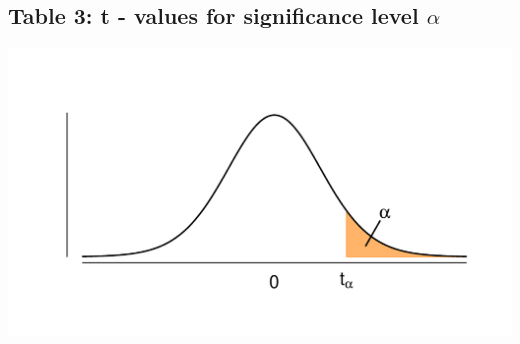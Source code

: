 \subsection{Table 3: t - values for significance level $\alpha$}
\label{table3}

\vspace*{-30pt}
\begin{minipage}{0.6\textwidth}
\hfill
\end{minipage}
\begin{minipage}{0.4\textwidth}
\includegraphics[width=\textwidth]{Files/Images/tdist.pdf}
\end{minipage}


